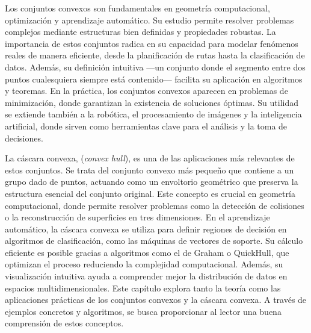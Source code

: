 \documentclass[12pt]{book}
\theoremstyle{definition}
\theoremstyle{plain}
\theoremstyle{remark}
\begin{document}
Los conjuntos convexos son fundamentales en geometría computacional, optimización y aprendizaje automático. Su estudio permite resolver problemas complejos mediante estructuras bien definidas y propiedades robustas. La importancia de estos conjuntos radica en su capacidad para modelar fenómenos reales de manera eficiente, desde la planificación de rutas hasta la clasificación de datos. Además, su definición intuitiva —un conjunto donde el segmento entre dos puntos cualesquiera siempre está contenido— facilita su aplicación en algoritmos y teoremas. En la práctica, los conjuntos convexos aparecen en problemas de minimización, donde garantizan la existencia de soluciones óptimas. Su utilidad se extiende también a la robótica, el procesamiento de imágenes y la inteligencia artificial, donde sirven como herramientas clave para el análisis y la toma de decisiones.

La cáscara convexa, (\emph{convex hull}), es una de las aplicaciones más relevantes de estos conjuntos. Se trata del conjunto convexo más pequeño que contiene a un grupo dado de puntos, actuando como un envoltorio geométrico que preserva la estructura esencial del conjunto original. Este concepto es crucial en geometría computacional, donde permite resolver problemas como la detección de colisiones o la reconstrucción de superficies en tres dimensiones. En el aprendizaje automático, la cáscara convexa se utiliza para definir regiones de decisión en algoritmos de clasificación, como las máquinas de vectores de soporte. Su cálculo eficiente es posible gracias a algoritmos como el de Graham o QuickHull, que optimizan el proceso reduciendo la complejidad computacional. Además, su visualización intuitiva ayuda a comprender mejor la distribución de datos en espacios multidimensionales. 
Este capítulo explora tanto la teoría como las aplicaciones prácticas de los conjuntos convexos y la cáscara convexa. A través de ejemplos concretos y algoritmos, se busca proporcionar al lector una buena comprensión de estos conceptos. 
\end{document}

